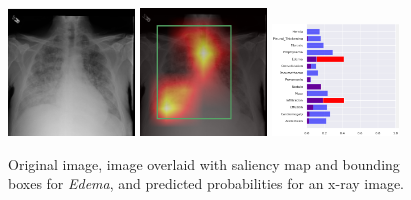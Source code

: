 \documentclass[12pt,oneside,a4paper]{report}
\begin{document}
\begin{figure}[H]
  \centering
  \includegraphics[width=0.3\textwidth]{images/preds/edema}\hspace{0.01\textwidth}%
  \includegraphics[width=0.3\textwidth]{images/preds/edema_cam}\hspace{0.01\textwidth}%
  \includegraphics[width=0.3\textwidth]{images/preds/edema_probs}\\[0.01\textwidth]
  \caption{Original image, image overlaid with saliency map and bounding boxes
    for \emph{Edema}, and predicted probabilities for an x-ray image.}
  \label{examples_10}
\end{figure}
\end{document}

